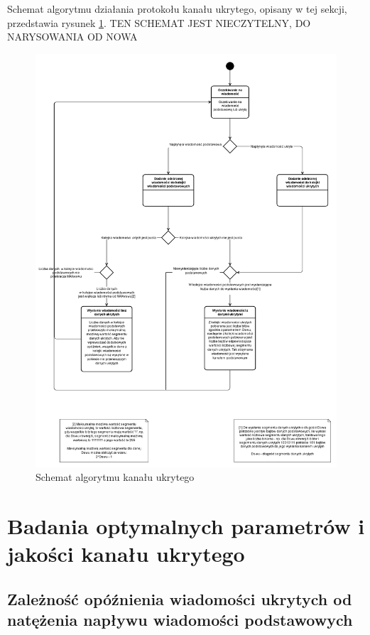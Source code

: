 \documentclass[a4paper, twoside, 12pt]{report}
\begin{document}
    Schemat algorytmu działania protokołu kanału ukrytego, opisany w tej sekcji,
    przedstawia rysunek \ref{CHANNELALGORITHM}. TEN SCHEMAT JEST NIECZYTELNY, DO
    NARYSOWANIA OD NOWA

        \begin{figure}[h]
                \centering
                \includegraphics[scale=0.2]{algorytm_protokolu_kanalu_ukrytego}
                \caption{Schemat algorytmu kanału ukrytego}
                \label{CHANNELALGORITHM}
        \end{figure}

\chapter{Badania optymalnych parametrów i jakości kanału ukrytego}
    \section{Zależność opóźnienia wiadomości ukrytych od natężenia napływu wiadomości podstawowych}
\end{document}
